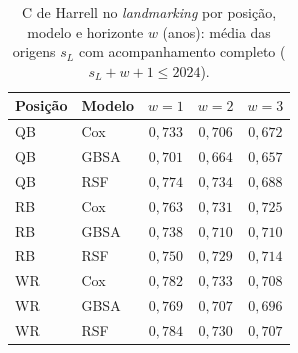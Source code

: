 \begin{table}[H]
\centering
\caption{C de Harrell no \textit{landmarking} por posição, modelo e horizonte $w$ (anos): média das origens $s_L$ com acompanhamento completo ($s_L + w + 1 \le 2024$).}
\label{tab:tgb_lm}
\thesistablesetup\footnotesize
\begin{tabular*}{\textwidth}{@{\extracolsep{\fill}}llccc@{}}
\toprule
\textbf{Posição} & \textbf{Modelo} & \textbf{$w=1$} & \textbf{$w=2$} & \textbf{$w=3$} \\
\midrule
QB & Cox  & $0{,}733$ & $0{,}706$ & $0{,}672$ \\
QB & GBSA & $0{,}701$ & $0{,}664$ & $0{,}657$ \\
QB & RSF  & $0{,}774$ & $0{,}734$ & $0{,}688$ \\
\midrule
RB & Cox  & $0{,}763$ & $0{,}731$ & $0{,}725$ \\
RB & GBSA & $0{,}738$ & $0{,}710$ & $0{,}710$ \\
RB & RSF  & $0{,}750$ & $0{,}729$ & $0{,}714$ \\
\midrule
WR & Cox  & $0{,}782$ & $0{,}733$ & $0{,}708$ \\
WR & GBSA & $0{,}769$ & $0{,}707$ & $0{,}696$ \\
WR & RSF  & $0{,}784$ & $0{,}730$ & $0{,}707$ \\
\bottomrule
\end{tabular*}
\end{table}
